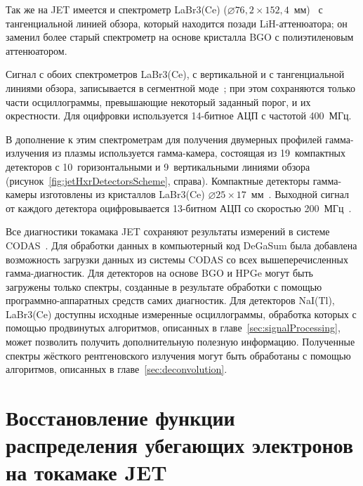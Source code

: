 Так же на JET имеется и спектрометр  LaBr3(Ce) ($\varnothing 76,2 \times 152,4$~мм)~\cite{Nocente2021} с тангенциальной линией обзора, который находится позади LiH-аттенюатора; он заменил более старый спектрометр на основе кристалла BGO с полиэтиленовым аттенюатором.~\cite{Curuia2017}

Сигнал с обоих спектрометров LaBr3(Ce), с вертикальной и с тангенциальной линиями обзора, записывается в сегментной моде~\cite{Pereira2008,Pereira2011}; при этом сохраняются только части осциллограммы, превышающие некоторый заданный порог, и их окрестности. Для оцифровки используется 14-битное АЦП с частотой 400~МГц. 


В дополнение к этим спектрометрам для получения двумерных профилей гамма-излучения из плазмы используется гамма-камера, состоящая из 19~компактных детекторов с 10~горизонтальными и 9~вертикальными линиями обзора (рисунок~\ref{fig:jetHxrDetectorsScheme}, справа). Компактные детекторы гамма-камеры изготовлены из кристаллов LaBr3(Ce) $\varnothing 25 \times 17$~мм~\cite{Rigamonti2018}. Выходной сигнал от каждого детектора оцифровывается 13-битном АЦП со скоростью 200~МГц~\cite{Fernandes2018}.

Все диагностики токамака JET сохраняют результаты измерений в системе CODAS~\cite{Jones1986}. Для обработки данных в компьютерный код DeGaSum была добавлена возможность загрузки данных из системы CODAS со всех вышеперечисленных гамма-диагностик. Для детекторов на основе BGO и HPGe могут быть загружены только спектры, созданные в результате обработки с помощью программно-аппаратных средств самих диагностик. Для детекторов NaI(Tl), LaBr3(Ce) доступны исходные измеренные осциллограммы, обработка которых с помощью продвинутых алгоритмов, описанных в главе~\ref{sec:signalProcessing}, может позволить получить дополнительную полезную информацию. Полученные спектры жёсткого рентгеновского излучения могут быть обработаны с помощью алгоритмов, описанных в главе~\ref{sec:deconvolution}. 


\section{Восстановление функции распределения убегающих электронов на токамаке JET}

